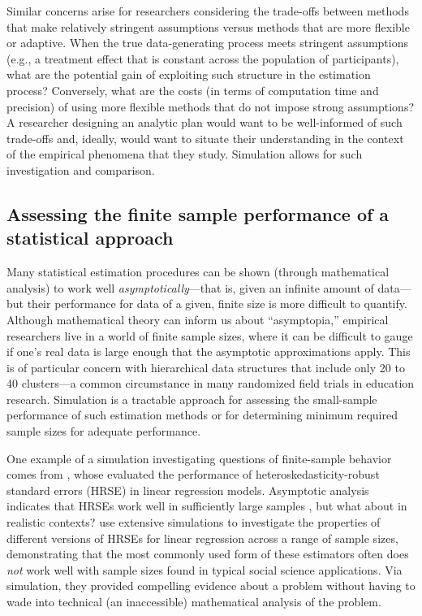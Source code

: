 \documentclass[
]{book}
\begin{document}
Similar concerns arise for researchers considering the trade-offs between methods that make relatively stringent assumptions versus methods that are more flexible or adaptive. When the true data-generating process meets stringent assumptions (e.g., a treatment effect that is constant across the population of participants), what are the potential gain of exploiting such structure in the estimation process?
Conversely, what are the costs (in terms of computation time and precision) of using more flexible methods that do not impose strong assumptions?
A researcher designing an analytic plan would want to be well-informed of such trade-offs and, ideally, would want to situate their understanding in the context of the empirical phenomena that they study.
Simulation allows for such investigation and comparison.

\subsection{Assessing the finite sample performance of a statistical approach}\label{assessing-the-finite-sample-performance-of-a-statistical-approach}

Many statistical estimation procedures can be shown (through mathematical analysis) to work well \emph{asymptotically}---that is, given an infinite amount of data---but their performance for data of a given, finite size is more difficult to quantify.
Although mathematical theory can inform us about ``asymptopia,'' empirical researchers live in a world of finite sample sizes, where it can be difficult to gauge if one's real data is large enough that the asymptotic approximations apply.
This is of particular concern with hierarchical data structures that include only 20 to 40 clusters---a common circumstance in many randomized field trials in education research.
Simulation is a tractable approach for assessing the small-sample performance of such estimation methods or for determining minimum required sample sizes for adequate performance.

One example of a simulation investigating questions of finite-sample behavior comes from \citet{longUsingHeteroscedasticityConsistent2000}, whose evaluated the performance of heteroskedasticity-robust standard errors (HRSE) in linear regression models.
Asymptotic analysis indicates that HRSEs work well in sufficiently large samples \citep[that is, it can be shown that they provide correct assessments of uncertainty when \(N\) is infinite,][]{White1980heteroskedasticity}, but what about in realistic contexts?
\citet{longUsingHeteroscedasticityConsistent2000} use extensive simulations to investigate the properties of different versions of HRSEs for linear regression across a range of sample sizes, demonstrating that the most commonly used form of these estimators often does \emph{not} work well with sample sizes found in typical social science applications.
Via simulation, they provided compelling evidence about a problem without having to wade into technical (an inaccessible) mathematical analysis of the problem.
\end{document}
